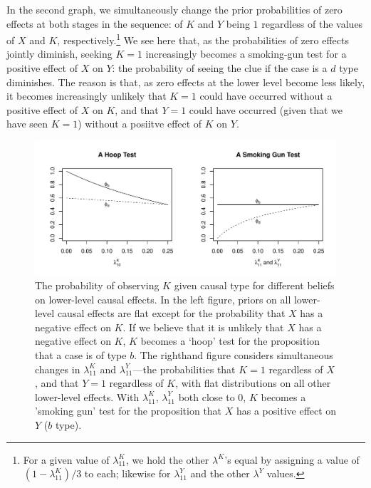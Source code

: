 \documentclass[12pt,]{book}
\let\rmarkdownfootnote\footnote%
\def\footnote{\protect\rmarkdownfootnote}
\begin{document}
In the second graph, we simultaneously change the prior probabilities of zero effects at both stages in the sequence: of \(K\) and \(Y\) being \(1\) regardless of the values of \(X\) and \(K\), respectively.\footnote{For a given value of \(\lambda^K_{11}\), we hold the other \(\lambda^K\)'s equal by assigning a value of \((1-\lambda^K_{11})/3\) to each; likewise for \(\lambda^Y_{11}\) and the other \(\lambda^Y\) values.} We see here that, as the probabilities of zero effects jointly diminish, seeking \(K=1\) increasingly becomes a smoking-gun test for a positive effect of \(X\) on \(Y\): the probability of seeing the clue if the case is a \(d\) type diminishes. The reason is that, as zero effects at the lower level become less likely, it becomes increasingly unlikely that \(K=1\) could have occurred without a positive effect of \(X\) on \(K\), and that \(Y=1\) could have occurred (given that we have seen \(K=1\)) without a posiitve effect of \(K\) on \(Y\).

\begin{figure}

{\centering \includegraphics[width=.85\textwidth]{ii_files/figure-latex/phis-1} 

}

\caption{The probability of observing $K$ given causal type for different beliefs on lower-level causal effects. In the left figure, priors on all lower-level causal effects are flat except for the probability that $X$ has a negative effect on $K$. If we believe that it is unlikely that $X$ has a negative effect on $K$, $K$ becomes a `hoop' test for the proposition that a case is of type $b$. The righthand figure considers simultaneous changes in $\lambda_{11}^K$ and  $\lambda_{11}^Y$---the probabilities that $K=1$ regardless of $X$, and that $Y=1$  regardless of $K$, with flat distributions on all other lower-level effects. With $\lambda_{11}^K$, $\lambda_{11}^Y$ both close to 0, $K$ becomes a 'smoking gun' test for the proposition that $X$ has a positive effect on $Y$ ($b$ type).}\label{fig:phis}
\end{figure}
\end{document}
